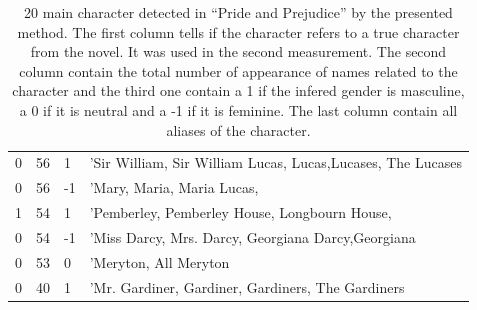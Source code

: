 \documentclass[a4paper, 12pt]{report}
\begin{document}
\begin{table}[]
{\begin{tabular}{|l|l|l|l|}
0  & 56  & 1  & 'Sir William, Sir William Lucas, Lucas,Lucases, The Lucases\\
0  & 56  & -1 & 'Mary, Maria, Maria Lucas,                                       \\
1  & 54  & 1  & 'Pemberley, Pemberley House, Longbourn House,                    \\
0  & 54  & -1 & 'Miss Darcy, Mrs. Darcy, Georgiana Darcy,Georgiana              \\
0  & 53  & 0  & 'Meryton, All Meryton                                     \\
0  & 40  & 1  & 'Mr. Gardiner, Gardiner, Gardiners, The Gardiners                \\
\hline
\end{tabular}
}
\caption{20 main character detected in ``Pride and Prejudice'' by the presented method. 
The first column tells if the character refers to a true character from the novel. It was used in the second measurement. 
The second column contain the total number of appearance of names related to the character and the third one contain a 1 if the infered gender is masculine, 
a 0 if it is neutral and a -1 if it is feminine. The last column contain all aliases of the character. }


\end{table}
\end{document}
